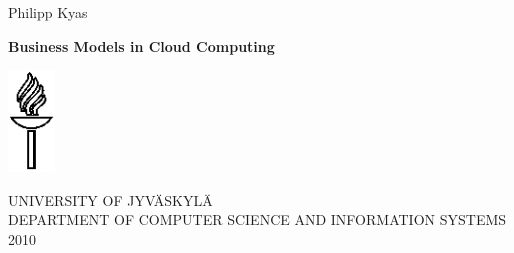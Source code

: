 \thispagestyle{empty}

\begin{center}

\vspace*{11cm}

Philipp Kyas

\vspace{0.5cm}

\textbf{\Large Business Models in Cloud Computing}

\vspace{11cm}

\includegraphics[height=2.7cm]{gfx/logo}

\normalsize
UNIVERSITY OF JYVÄSKYLÄ\\
\footnotesize
DEPARTMENT OF COMPUTER SCIENCE AND INFORMATION SYSTEMS\\
2010

\end{center}